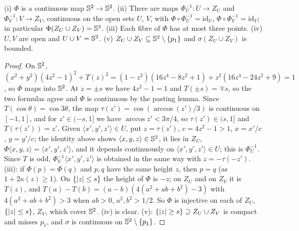 \begin{lemma}\label{lem:fold}
(i) $\Phi$ is a continuous map $\mathbb{S}^2\to\mathbb{S}^2$. (ii) There are maps $\Phi_U^{-1}:U\to Z_U$ and
$\Phi_V^{-1}:V\to Z_V$, continuous on the open sets $U$, $V$, with $\Phi\circ\Phi_U^{-1}=\mathrm{id}_U$,
$\Phi\circ\Phi_V^{-1}=\mathrm{id}_V$; in particular $\Phi(Z_U\cup Z_V)=\mathbb{S}^2$. (iii) Each fibre of $\Phi$ has at
most three points. (iv) $U,V$ are open and $U\cup V=\mathbb{S}^2$. (v) $Z_U\cup Z_V\subseteq\mathbb{S}^2\setminus\{p_1\}$ and
$\sigma(Z_U\cup Z_V)$ is bounded.
\end{lemma}
\begin{proof}
On $\mathbb{S}^2$, $(x^2+y^2)(4z^2-1)^2+T(z)^2=(1-z^2)(16z^4-8z^2+1)+z^2(16z^4-24z^2+9)=1$, so $\Phi$ maps into
$\mathbb{S}^2$. At $z=\pm s$ we have $4z^2-1=1$ and $T(\pm s)=\mp s$, so the two formulas agree and $\Phi$ is
continuous by the pasting lemma. Since $T(\cos\theta)=\cos3\theta$, the map
$\tau(z')=\cos(\arccos(z')/3)$ is continuous on $[-1,1]$, and for $z'\in(-s,1]$ we have
$\arccos z'<3\pi/4$, so $\tau(z')\in(s,1]$ and $T(\tau(z'))=z'$. Given $\langle x',y',z'\rangle\in U$, put
$z=\tau(z')$, $c=4z^2-1>1$, $x=x'/c$, $y=y'/c$; the identity above shows $\langle x,y,z\rangle\in\mathbb{S}^2$, it lies in
$Z_U$, $\Phi\langle x,y,z\rangle=\langle x',y',z'\rangle$, and it depends continuously on
$\langle x',y',z'\rangle\in U$; this is $\Phi_U^{-1}$. Since $T$ is odd, $\Phi_V^{-1}\langle x',y',z'\rangle$ is obtained
in the same way with $z=-\tau(-z')$. (iii): if $\Phi(p)=\Phi(q)$ and $p,q$ have the same height $z$, then $p=q$
(as $1+2\kappa(z)\ge1$). On $\{\lvert z\rvert\le s\}$ the height of $\Phi$ is $-z$; on $Z_U$ and on $Z_V$ it is $T(z)$, and
$T(a)-T(b)=(a-b)(4(a^2+ab+b^2)-3)$ with $4(a^2+ab+b^2)>3$ when $ab>0$, $a^2,b^2>1/2$. So $\Phi$ is injective on each
of $Z_U$, $\{\lvert z\rvert\le s\}$, $Z_V$, which cover $\mathbb{S}^2$. (iv) is clear. (v): $\{\lvert z\rvert\ge s\}\supseteq Z_U\cup Z_V$ is
compact and misses $p_1$, and $\sigma$ is continuous on $\mathbb{S}^2\setminus\{p_1\}$.
\end{proof}

